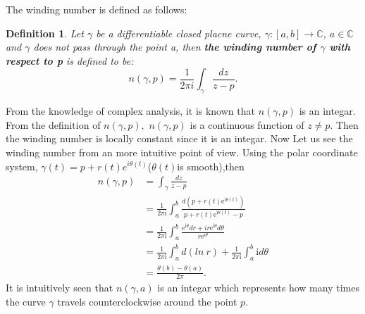 \documentclass[11pt]{article}
\newtheorem{definition}{Definition}
\numberwithin{equation}{section} \numberwithin{theorem}{section}
\numberwithin{lemma}{section} \numberwithin{remark}{section}
\numberwithin{table}{section} \numberwithin{corollary}{section}
\numberwithin{example}{section} \numberwithin{conjecture}{section}
\numberwithin{assumption}{section}
\numberwithin{definition}{section}
\numberwithin{proposition}{section}
\begin{document}
The winding number is defined as follows:
\begin{definition}
Let $\gamma$ be a differentiable closed placne curve, $\gamma:[a,b]\rightarrow \mathbb{C}$, $a\in\mathbb{C}$ and $\gamma$ does not pass through the point a, then \textbf{the winding number of $\gamma$ with respect to p} is defined to be:
\begin{equation}
    n(\gamma,p)=\frac{1}{2\pi i} \int_{\gamma} \frac{dz}{z-p}.
\end{equation}
\end{definition}
From the knowledge of complex analysis, it is known that $n(\gamma,p)$ is an integar\cite[\S 4.2 Lemma 1]{complexanalysis1979ahlfors}. From the definition of $n(\gamma,p),$ $n(\gamma,p)$ is a continuous function of $z\neq p$. Then the winding number is locally constant since it is an integar. Now Let us see the winding number from an more intuitive point of view. 
Using the polar coordinate system, $\gamma(t)=p+r(t)e^{i\theta(t)}$($\theta(t)$is smooth),then 
\begin{align*}
  n(\gamma,p)
  &= \int_{\gamma} \frac{dz}{z-p} \\
  &=  \frac{1}{2\pi \mathrm{i}}\int_a^b \frac{d(p+r(t)\mathrm{e}^{\mathrm{i}\theta(t)})}{p+r(t)\mathrm{e}^{\mathrm{i}\theta(t)}-p} \\
  &=  \frac{1}{2\pi \mathrm{i}}\int_a^b \frac{\mathrm{e}^{\mathrm{i}\theta}dr+ir\mathrm{e}^{\mathrm{i}\theta}d\theta}{r\mathrm{e}^{\mathrm{i}\theta}}\\
  &=\frac{1}{2\pi \mathrm{i}}\int_a^b d(ln \ r) +\frac{1}{2\pi \mathrm{i}}\int_a^b \mathrm{i} d\theta\\
  &=\frac{\theta(b)-\theta(a)}{2\pi}.
\end{align*}
It is intuitively seen that $n(\gamma,a)$ is an integar which represents how many times the curve $\gamma$ travels counterclockwise around the point $p$.
\end{document}
